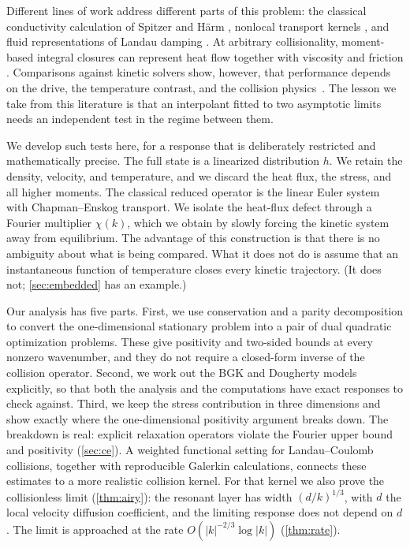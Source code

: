 \documentclass[11pt]{article}
\theoremstyle{definition}
\theoremstyle{remark}
\numberwithin{equation}{section}
\begin{document}
Different lines of work address different parts of this problem: the
classical conductivity calculation of Spitzer and H\"arm
\cite{SpitzerHarm1953}, nonlocal transport kernels
\cite{LMV1983}, and fluid representations of Landau damping
\cite{HP1990,Snyder1997,Hunana2019}.
At arbitrary collisionality, moment-based integral closures can represent
heat flow together with viscosity and friction \cite{JiHeld2014}.
Comparisons against kinetic solvers show, however, that performance
depends on the drive, the temperature contrast, and the collision
physics~\cite{Brodrick2017}. The lesson we take from this literature is
that an interpolant fitted to two asymptotic limits needs an independent
test in the regime between them.

We develop such tests here, for a response that is deliberately
restricted and mathematically precise. The full state is a linearized
distribution $h$. We retain the density, velocity, and temperature, and
we discard the heat flux, the stress, and all higher moments. The
classical reduced operator is the linear Euler system with
Chapman--Enskog transport. We isolate the heat-flux defect through a
Fourier multiplier $\chi(k)$, which we obtain by slowly forcing the
kinetic system away from equilibrium. The advantage of this construction
is that there is no ambiguity about what is being compared. What it does
not do is assume that an instantaneous function of temperature closes
every kinetic trajectory. (It does not; \cref{sec:embedded} has an
example.)

Our analysis has five parts. First, we use conservation and a parity
decomposition to convert the one-dimensional stationary problem into a
pair of dual quadratic optimization problems. These give positivity and
two-sided bounds at every nonzero wavenumber, and they do not require a
closed-form inverse of the collision operator. Second, we work out the
BGK and Dougherty models explicitly, so that both the analysis and the
computations have exact responses to check against. Third, we keep the
stress contribution in three dimensions and show exactly where the
one-dimensional positivity argument breaks down. The breakdown is real:
explicit relaxation operators violate the Fourier upper bound and
positivity (\cref{sec:ce}). A weighted functional
setting for Landau--Coulomb collisions, together with reproducible
Galerkin calculations, connects these estimates to a more realistic
collision kernel. For that kernel we also prove the collisionless limit
(\cref{thm:airy}): the resonant layer has width $(d/k)^{1/3}$, with $d$
the local velocity diffusion coefficient, and the limiting response does
not depend on $d$. The limit is approached at the rate
$O(|k|^{-2/3}\log|k|)$ (\cref{thm:rate}).
\end{document}
